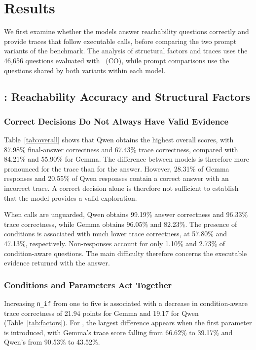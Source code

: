 \section{Results}
\label{sec:results}

We first examine whether the models answer reachability questions correctly and provide traces that follow executable calls, before comparing the two prompt variants of the benchmark. The analysis of structural factors and traces uses the 46,656 questions evaluated with \benchmark~(CO), while prompt comparisons use the questions shared by both variants within each model.

\subsection{: Reachability Accuracy and Structural Factors}

\subsubsection{Correct Decisions Do Not Always Have Valid Evidence}

Table~\ref{tab:overall} shows that Qwen obtains the highest overall scores, with 87.98\% final-answer correctness and 67.43\% trace correctness, compared with 84.21\% and 55.90\% for Gemma. The difference between models is therefore more pronounced for the trace than for the answer. However, 28.31\% of Gemma responses and 20.55\% of Qwen responses contain a correct answer with an incorrect trace. A correct decision alone is therefore not sufficient to establish that the model provides a valid exploration.



When calls are unguarded, Qwen obtains 99.19\% answer correctness and 96.33\% trace correctness, while Gemma obtains 96.05\% and 82.23\%. The presence of conditions is associated with much lower trace correctness, at 57.80\% and 47.13\%, respectively. Non-responses account for only 1.10\% and 2.73\% of condition-aware questions. The main difficulty therefore concerns the executable evidence returned with the answer.

\subsubsection{Conditions and Parameters Act Together}

Increasing \mbox{\texttt{n\_if}} from one to five is associated with a decrease in condition-aware trace correctness of 21.94 points for Gemma and 19.17 for Qwen (Table~\ref{tab:factors}). For , the largest difference appears when the first parameter is introduced, with Gemma's trace score falling from 66.62\% to 39.17\% and Qwen's from 90.53\% to 43.52\%.

